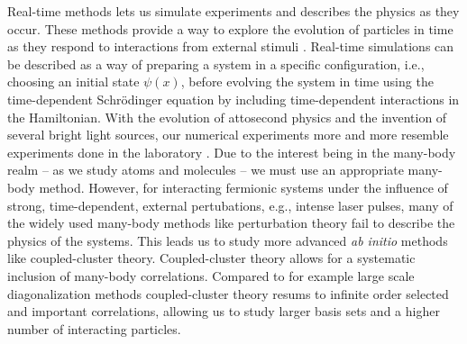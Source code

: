     Real-time methods lets us simulate experiments and describes the physics as
    they occur.
    These methods provide a way to explore the evolution of particles in time as
    they respond to interactions from external stimuli \cite{joshua-magnus}.
    Real-time simulations can be described as a way of preparing a system in a
    specific configuration, i.e., choosing an initial state $\psi(x)$, before
    evolving the system in time using the time-dependent Schrödinger equation by
    including time-dependent interactions in the Hamiltonian.
    With the evolution of attosecond physics and the invention of several bright
    light sources, our numerical experiments more and more resemble experiments
    done in the laboratory \cite{joachain2012atoms}.
    Due to the interest being in the many-body realm -- as we study atoms and
    molecules -- we must use an appropriate many-body method.
    However, for interacting fermionic systems under the influence of strong,
    time-dependent, external pertubations, e.g., intense laser pulses, many of
    the widely used many-body methods like perturbation theory fail to describe
    the physics of the systems.
    This leads us to study more advanced \emph{ab initio} methods like
    coupled-cluster theory.
    Coupled-cluster theory allows for a systematic inclusion of many-body
    correlations.
    Compared to for example large scale diagonalization methods coupled-cluster
    theory resums to infinite order selected and important correlations,
    allowing us to study larger basis sets and a higher number of interacting
    particles.


